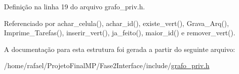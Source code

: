 Definição na linha 19 do arquivo grafo\+\_\+priv.\+h.



Referenciado por achar\+\_\+celula(), achar\+\_\+id(), existe\+\_\+vert(), Grava\+\_\+\+Arq(), Imprime\+\_\+\+Tarefas(), inserir\+\_\+vert(), ja\+\_\+feito(), maior\+\_\+id() e remover\+\_\+vert().



A documentação para esta estrutura foi gerada a partir do seguinte arquivo\+:\begin{DoxyCompactItemize}
\item 
/home/rafael/\+Projeto\+Final\+M\+P/\+Fase2\+Interface/include/\hyperlink{grafo__priv_8h}{grafo\+\_\+priv.\+h}\end{DoxyCompactItemize}
